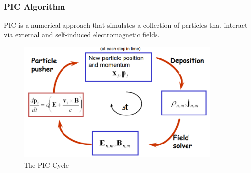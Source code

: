 \documentclass{beamer}
\begin{document}
\begin{frame}
    \small
    \frametitle{PIC Algorithm}
    PIC is a numerical approach that simulates a collection of particles that interact via external and self-induced electromagnetic fields.
    \begin{figure}
        \includegraphics[width=10cm, height=6cm]{images/PIC.png}
        \centering
        \caption{The PIC Cycle}
    \end{figure}

\end{frame}
\end{document}
